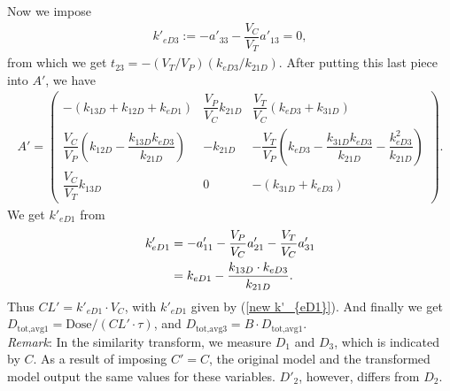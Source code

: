 Now we impose 
\begin{align}
k'_{eD3} := -a'_{33} - \dfrac{V_C}{V_T}a'_{13} = 0,
\end{align}
from which we get $t_{23} = -(V_T/V_P)(k_{eD3}/k_{21D})$. After putting this last piece into $A'$, we have
\begin{align}
A' = \begin{pmatrix}
-(k_{13D} + k_{12D} + k_{eD1})                           & \dfrac{V_P}{V_C}k_{21D} & \dfrac{V_T}{V_C}(k_{eD3} + k_{31D}) \\
\dfrac{V_C}{V_P}\left(k_{12D} - \dfrac{k_{13D}k_{eD3}}{k_{21D}}\right)  & -k_{21D}                & -\dfrac{V_T}{V_P}\left(k_{eD3} - \dfrac{k_{31D}k_{eD3}}{k_{21D}} - \dfrac{k_{eD3}^2}{k_{21D}}\right)                      \\
\dfrac{V_C}{V_T}k_{13D}                                  & 0                       & -(k_{31D} + k_{eD3})
\end{pmatrix}.
\end{align}
We get $k'_{eD1}$ from
\begin{align}
k'_{eD1} &= -a'_{11} - \dfrac{V_P}{V_C}a'_{21} - \dfrac{V_T}{V_C}a'_{31} \nonumber \\ 
&= k_{eD1} - \dfrac{k_{13D} \cdot k_{eD3}}{k_{21D}}. \label{new k'_{eD1}}
\end{align}
Thus $CL' = k'_{eD1} \cdot V_C$, with $k'_{eD1}$ given by (\ref{new k'_{eD1}}). And finally we get $D_{\text{tot,avg}1} = \text{Dose}/(CL' \cdot \tau)$, and $D_{\text{tot,avg}3} = B \cdot D_{\text{tot,avg}1}$. \\

\textit{Remark}: In the similarity transform, we measure $D_1$ and $D_3$, which is indicated by $C$. As a result of imposing $C' = C$, the original model and the transformed model output the same values for these variables. $D'_2$, however, differs from $D_2$.